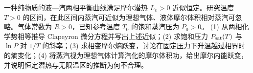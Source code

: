 一种纯物质的液—汽两相平衡曲线满足摩尔潜热 \(L_v>0\) 近似恒定。研究温度 \(T>0\) 的区间，在此区间内蒸汽可近似为理想气体、液体摩尔体积相对蒸汽可忽略。气体常数为 \(R>0\)，已知参考温度 \(T_0\) 的饱和蒸汽压为 \(P_0>0\)。
(1) 从两相化学势相等推导 Clapeyron 微分方程并写出上述近似；(2) 求饱和压力 \(P_{\rm sat}(T)\) 与 \(\ln P\) 对 \(1/T\) 的斜率；(3) 求相变摩尔熵跃变，讨论在固定压力下升温越过相界时的熵变化；(4) 将蒸汽视为理想气体计算汽化的摩尔体积功，给出摩尔内能跃变，并说明恒定潜热与无限温区的推断为何不合理。

